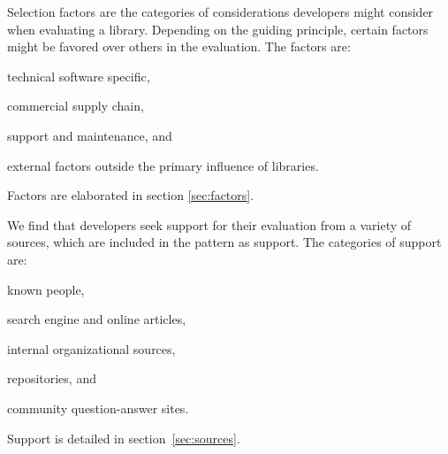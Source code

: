 Selection factors are the categories of considerations developers might consider when evaluating a library. Depending on the guiding principle, certain factors might be favored over others in the evaluation. The factors are:
\begin{inparaenum}[(F1)] 
\item technical software specific, 
\item commercial supply chain, 
\item support and maintenance, and 
\item external factors outside the primary influence of libraries.
\end{inparaenum} 
Factors are elaborated in section \ref{sec:factors}.

We find that developers seek support for their evaluation from a variety of sources, which are included in the pattern as support. The categories of support are:
\begin{inparaenum}[(S1)] 
\item known people, 
\item search engine and online articles, 
\item internal organizational sources, 
\item repositories, and 
\item community question-answer sites.
\end{inparaenum} 
Support is detailed in section~\ref{sec:sources}.























